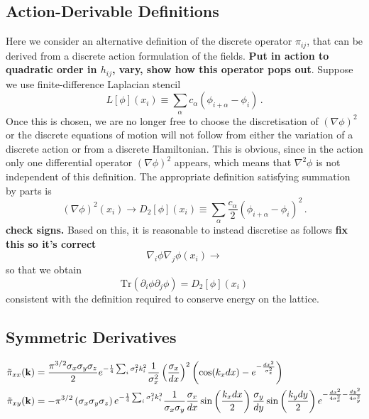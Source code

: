 \documentclass{revtex4}
\begin{document}
\subsection{Action-Derivable Definitions}
Here we consider an alternative definition of the discrete operator $\pi_{ij}$, that can be derived from a discrete action formulation of the fields.
{\bf Put in action to quadratic order in $h_{ij}$, vary, show how this operator pops out}.
Suppose we use finite-difference Laplacian stencil
\begin{equation}
  L[\phi](x_i) \equiv \sum_\alpha c_\alpha\left(\phi_{i+\alpha}-\phi_i\right) \, .
\end{equation}
Once this is chosen, we are no longer free to choose the discretisation of $(\nabla\phi)^2$ or the discrete equations of motion will not follow from either the variation of a discrete action or from a discrete Hamiltonian.
This is obvious, since in the action only one differential operator $(\nabla\phi)^2$ appears, which means that $\nabla^2\phi$ is not independent of this definition.
The appropriate definition satisfying summation by parts is
\begin{equation}
  (\nabla\phi)^2(x_i) \to D_2[\phi](x_i) \equiv \sum_\alpha \frac{c_\alpha}{2}\left(\phi_{i+\alpha}-\phi_i\right)^2 \, .
\end{equation}
{\bf check signs.}
Based on this, it is reasonable to instead discretise as follows {\bf fix this so it's correct}
\begin{equation}
  \nabla_i\phi\nabla_j\phi(x_i) \to %
\end{equation}
so that we obtain
\begin{equation}
  \mathrm{Tr}(\partial_i\phi\partial_j\phi) = D_2[\phi](x_i)
\end{equation}
consistent with the definition required to conserve energy on the lattice.

\subsection{Symmetric Derivatives}
\begin{align}
  \tilde{\pi}_{xx}({\bf k}) &= \frac{\pi^{3/2}\sigma_x\sigma_y\sigma_z}{2}e^{-\frac{1}{4}\sum_i\sigma_I^2 k_i^2}\frac{1}{\sigma_x^2}\left(\frac{\sigma_x}{dx}\right)^2\left(\cos(k_xdx) - e^{-\frac{dx^2}{\sigma_z^2}}\right) \\
  \tilde{\pi}_{xy}({\bf k}) &= -\pi^{3/2}\left(\sigma_x\sigma_y\sigma_z\right)e^{-\frac{1}{4}\sum_i\sigma_I^2 k_i^2}\frac{1}{\sigma_x\sigma_y}\frac{\sigma_x}{dx}\sin\left(\frac{k_xdx}{2}\right)\frac{\sigma_y}{dy}\sin\left(\frac{k_ydy}{2}\right)e^{-\frac{dx^2}{4\sigma_x^2}-\frac{dy^2}{4\sigma_y^2}}
\end{align}
\end{document}
